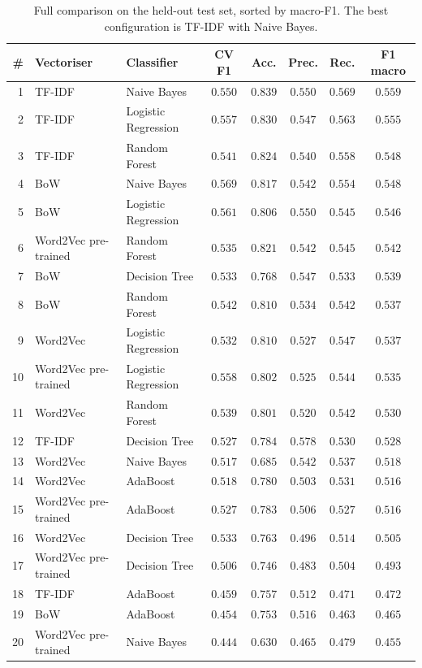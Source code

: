 \documentclass[11pt,a4paper]{article}
\begin{document}
\begin{table}[H]
\centering
\small
\begin{tabular}{rllccccc}
\toprule
\# & \textbf{Vectoriser} & \textbf{Classifier} & \textbf{CV F1} & \textbf{Acc.} & \textbf{Prec.} & \textbf{Rec.} & \textbf{F1 macro} \\
\midrule
1  & TF-IDF & Naive Bayes & $0.550$ & $0.839$ & $0.550$ & $0.569$ & $\mathbf{0.559}$ \\
2  & TF-IDF & Logistic Regression & $0.557$ & $0.830$ & $0.547$ & $0.563$ & $0.555$ \\
3  & TF-IDF & Random Forest & $0.541$ & $0.824$ & $0.540$ & $0.558$ & $0.548$ \\
4  & BoW & Naive Bayes & $0.569$ & $0.817$ & $0.542$ & $0.554$ & $0.548$ \\
5  & BoW & Logistic Regression & $0.561$ & $0.806$ & $0.550$ & $0.545$ & $0.546$ \\
6  & Word2Vec pre-trained & Random Forest & $0.535$ & $0.821$ & $0.542$ & $0.545$ & $0.542$ \\
7  & BoW & Decision Tree & $0.533$ & $0.768$ & $0.547$ & $0.533$ & $0.539$ \\
8  & BoW & Random Forest & $0.542$ & $0.810$ & $0.534$ & $0.542$ & $0.537$ \\
9  & Word2Vec & Logistic Regression & $0.532$ & $0.810$ & $0.527$ & $0.547$ & $0.537$ \\
10 & Word2Vec pre-trained & Logistic Regression & $0.558$ & $0.802$ & $0.525$ & $0.544$ & $0.535$ \\
11 & Word2Vec & Random Forest & $0.539$ & $0.801$ & $0.520$ & $0.542$ & $0.530$ \\
12 & TF-IDF & Decision Tree & $0.527$ & $0.784$ & $0.578$ & $0.530$ & $0.528$ \\
13 & Word2Vec & Naive Bayes & $0.517$ & $0.685$ & $0.542$ & $0.537$ & $0.518$ \\
14 & Word2Vec & AdaBoost & $0.518$ & $0.780$ & $0.503$ & $0.531$ & $0.516$ \\
15 & Word2Vec pre-trained & AdaBoost & $0.527$ & $0.783$ & $0.506$ & $0.527$ & $0.516$ \\
16 & Word2Vec & Decision Tree & $0.533$ & $0.763$ & $0.496$ & $0.514$ & $0.505$ \\
17 & Word2Vec pre-trained & Decision Tree & $0.506$ & $0.746$ & $0.483$ & $0.504$ & $0.493$ \\
18 & TF-IDF & AdaBoost & $0.459$ & $0.757$ & $0.512$ & $0.471$ & $0.472$ \\
19 & BoW & AdaBoost & $0.454$ & $0.753$ & $0.516$ & $0.463$ & $0.465$ \\
20 & Word2Vec pre-trained & Naive Bayes & $0.444$ & $0.630$ & $0.465$ & $0.479$ & $0.455$ \\
\bottomrule
\end{tabular}
\caption{Full comparison on the held-out test set, sorted by macro-F1. The best
configuration is TF-IDF with Naive Bayes.}
\label{tab:main}
\end{table}
\end{document}
